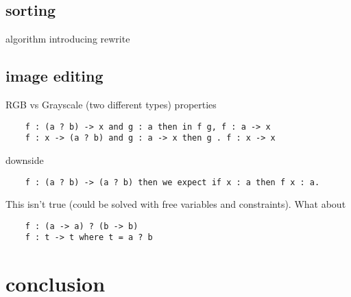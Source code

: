 \documentclass{article}
\begin{document}
\subsection{sorting}
  algorithm
  introducing rewrite

\subsection{image editing}
  RGB vs Grayscale (two different types)
  properties
\begin{verbatim}
    f : (a ? b) -> x and g : a then in f g, f : a -> x
    f : x -> (a ? b) and g : a -> x then g . f : x -> x
\end{verbatim}
  downside
\begin{verbatim}
    f : (a ? b) -> (a ? b) then we expect if x : a then f x : a.
\end{verbatim}
This isn't true (could be solved with free variables and constraints).
What about
\begin{verbatim}
    f : (a -> a) ? (b -> b)
    f : t -> t where t = a ? b
\end{verbatim}

  


\section{conclusion}
\end{document}
